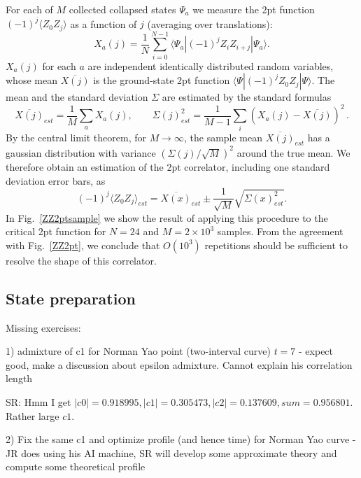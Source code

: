 \documentclass[a4paper,11pt]{article}
\theoremstyle{remark}
\theoremstyle{theorem}
\begin{document}
For each of $M$ collected collapsed states $\Psi_a$ we measure the 2pt function $(-1)^j\langle Z_0 Z_{j}\rangle$ as a function of $j$ (averaging over translations):
\begin{equation}\label{sample}
X_{a}(j)=\frac{1}{N} \sum_{i=0}^{N-1} \langle \Psi_a|(-1)^j Z_i Z_{i+j}|\Psi_a\rangle.
\end{equation}
$X_{a}(j)$ for each $a$ are independent identically distributed random variables, whose mean $\overline{X(j)}$ is the ground-state 2pt function $\langle \Psi|(-1)^j Z_0 Z_{j}|\Psi\rangle$. The mean and the standard deviation $\Sigma$ are estimated by the standard formulas
\begin{equation}
	\overline{X(j)}_{est}=\frac{1}{M} \sum_{a} X_{a}(j),\qquad
\Sigma(j)^2_{est} = \frac{1}{M-1}\sum_i (X_a(j) - \overline{X(j)})^2\,.
\end{equation}
By the central limit theorem, for $M\to\infty$, the sample mean $\overline{X(j)}_{est}$ has a gaussian distribution with variance $ (\Sigma(j)/\sqrt{M})^2$ around the true mean.  We therefore obtain an estimation of the 2pt correlator, including one standard deviation error bars, as
\begin{equation}
(-1)^j \langle  Z_0 Z_{j}\rangle_{est} = \overline{X(x)}_{est}\pm \frac{1}{\sqrt{M}} \sqrt{\Sigma(x)^2_{est}}.
\label{eq:conf}
\end{equation}
In Fig.~\ref{ZZ2ptsample} we show the result of applying this procedure to the critical 2pt function for $N=24$ and $M=2\times 10^3$ samples. 
From the agreement with Fig.~\ref{ZZ2pt}, we conclude that $O(10^3)$ repetitions should be sufficient to resolve the shape of this correlator.

\subsection{State preparation}

Missing exercises:

1) admixture of c1 for Norman Yao point (two-interval curve) $t=7$ - expect good, make a discussion about epsilon admixture. Cannot explain his correlation length

SR: Hmm I get $|c0|=0.918995, |c1|=0.305473, |c2|=0.137609, sum=0.956801$. Rather large $c1$.

2) Fix the same c1 and optimize profile (and hence time) for Norman Yao curve - JR does using his AI machine, 
SR will develop some approximate theory and compute some theoretical profile
\end{document}
